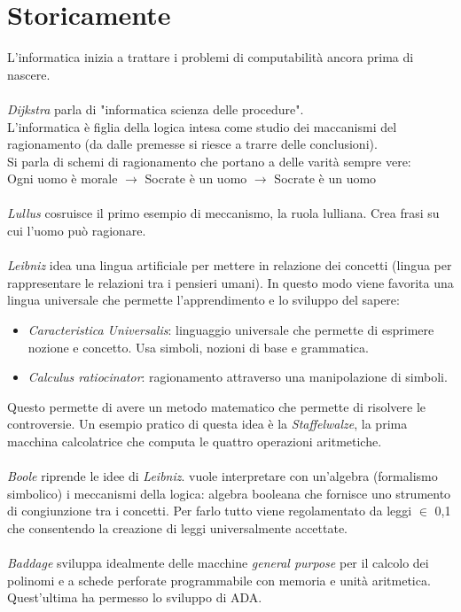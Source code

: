 \documentclass[10pt,a4paper]{book}
\begin{document}
\section{Storicamente}
L'informatica inizia a trattare i problemi di computabilit\`a ancora prima di nascere.\\\\
\noindent
\textit{Dijkstra} parla di "informatica scienza delle procedure".\\
L'informatica \`e figlia della logica intesa come studio dei maccanismi del ragionamento (da dalle premesse si riesce a trarre delle conclusioni).\\
Si parla di schemi di ragionamento che portano a delle varit\`a sempre vere:\\
Ogni uomo \`e morale $\longrightarrow$ Socrate \`e un uomo $\longrightarrow$ Socrate \`e un uomo
\\\\
\textit{Lullus} cosruisce il primo esempio di meccanismo, la ruola lulliana. Crea frasi su cui l'uomo pu\`o ragionare.
\\\\
\textit{Leibniz} idea una lingua artificiale per mettere in relazione dei concetti (lingua per rappresentare le relazioni tra i pensieri umani). In questo modo viene favorita una lingua universale che permette l'apprendimento e lo sviluppo del sapere:
\begin{itemize}
\item \textit{Caracteristica Universalis}: linguaggio universale che permette di esprimere nozione e concetto. Usa simboli, nozioni di base e grammatica.
\item \textit{Calculus ratiocinator}: ragionamento attraverso una manipolazione di simboli.
\end{itemize}
\noindent
Questo permette di avere un metodo matematico che permette di risolvere le controversie. Un esempio pratico di questa idea \`e la \textit{Staffelwalze}, la prima macchina calcolatrice che computa le quattro operazioni aritmetiche.
\\\\
\textit{Boole} riprende le idee di \textit{Leibniz}. vuole interpretare con un'algebra (formalismo simbolico) i meccanismi della logica: algebra booleana che fornisce uno strumento di congiunzione tra i concetti. Per farlo tutto viene regolamentato da leggi $\in$ {0,1} che consentendo la creazione di leggi universalmente accettate.\\\\
\textit{Baddage} sviluppa  idealmente delle macchine \textit{general purpose} per il calcolo dei polinomi e a schede perforate programmabile con memoria e unit\`a aritmetica. Quest'ultima ha permesso lo sviluppo di ADA.\\\\
\end{document}
